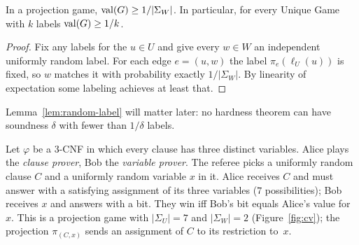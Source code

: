 \begin{lemma}\label{lem:random-label}
In a projection game, $\operatorname{val}(G)\ge 1/|\Sigma_W|$.  In particular, for every Unique Game with $k$ labels
$\operatorname{val}(G)\ge1/k$.
\end{lemma}
\begin{proof}
Fix any labels for the $u\in U$ and give every $w\in W$ an independent uniformly random
label.  For each edge $e=(u,w)$ the label $\pi_e(\ell_U(u))$ is fixed, so $w$ matches it with
probability exactly $1/|\Sigma_W|$.  By linearity of expectation some labeling achieves at least that.
\end{proof}

\noindent
Lemma~\ref{lem:random-label} will matter later: no hardness theorem can have soundness $\delta$ with
fewer than $1/\delta$ labels.

\begin{example}\label{ex:cv}
Let $\varphi$ be a $3$-CNF in which every clause has three distinct variables.  Alice plays the
\emph{clause prover}, Bob the \emph{variable prover}.  The referee picks a uniformly random clause
$C$ and a uniformly random variable $x$ in it.  Alice receives $C$ and must answer with a
satisfying assignment of its three variables ($7$ possibilities); Bob receives $x$ and answers
with a bit.  They win iff Bob's bit equals Alice's value for $x$.  This is a projection game with
$|\Sigma_U|=7$ and $|\Sigma_W|=2$ (Figure~\ref{fig:cv}); the projection $\pi_{(C,x)}$ sends an
assignment of $C$ to its restriction to~$x$.
\end{example}

